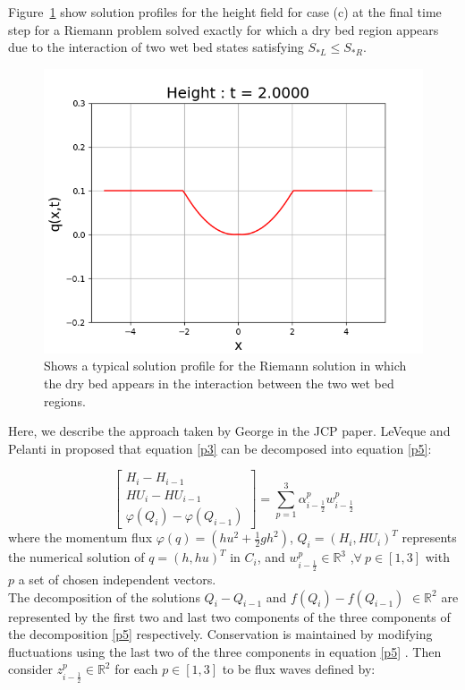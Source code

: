 \documentclass[12pt,a4paper]{article}
\begin{document}
	Figure~\ref{fig:middle} show solution profiles for the height field  for case (c) at the final time step for a Riemann problem  solved exactly for which a dry bed region appears due to the interaction of two wet bed states satisfying $S_{*L} \le S_{*R}$.
	\begin{figure}[H]
		\centering
		\includegraphics[width=0.8\linewidth]{images/middle}
		\caption{ Shows a typical solution profile for the Riemann solution in which the dry bed appears in the interaction between the two wet bed regions.}
		\label{fig:middle}
	\end{figure}
	
	
	Here, we describe the approach taken by George in the JCP paper\cite{ge:2008}. LeVeque and Pelanti in \cite{leveque2001class} proposed that equation \eqref{p3} can be decomposed into equation \eqref{p5}:
	
	\begin{equation}
		\begin{bmatrix} 
			H_{i} - H_{i-1}\\ 	HU_{i} - HU_{i-1} \\  \varphi(Q_{i}) - \varphi(Q_{i-1}) 
		\end{bmatrix} = \sum_{p=1}^{3} \alpha_{i-\frac{1}{2}}^{p} w_{i-\frac{1}{2}}^{p}
		\label{p5}
	\end{equation}
	where the momentum flux $\varphi(q) = (hu^{2} + \frac{1}{2} gh^{2})$, $Q_{i} = (H_{i},HU_{i})^{T}$ represents the numerical solution of $q = (h,hu)^{T}$ in $C_{i}$, and $w_{i-\frac{1}{2}}^{p} \in \mathbb{R}^{3}$ ,$\forall ~ p \in [1,3] $ with $p$ a set of chosen independent vectors. \\
	
	The decomposition of the solutions $Q_{i} - Q_{i-1} $  and  $f(Q_{i}) - f(Q_{i-1})$ $ \in  \mathbb{R}^{2}$ are represented by the first two and last two components of the three components of the decomposition \eqref{p5} respectively.  Conservation is maintained by modifying fluctuations using the last two of the three components  in equation \eqref{p5} \cite{ba-le-mi-ro:2003}. Then  consider $z_{i-\frac{1}{2}}^{p} \in \mathbb{R}^{2}$ for each $p \in [1,3]$ to be flux waves defined by:
	
\end{document}
